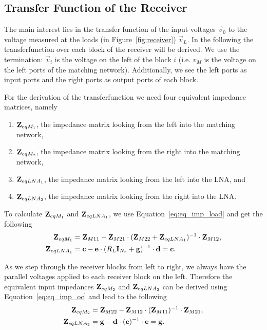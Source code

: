 \subsection{Transfer Function of the Receiver}
\label{sec:transf}
The main interest lies in the transfer function of the input voltages $\vec{v}_0$ to the voltage measured at the loads (in Figure~\ref{fig:receiver}) $\vec{v}_L$.
In the following the transferfunction over each block of the receiver will be derived.
We use the termination: $\vec{v}_i$ is the voltage on the left of the block $i$ (i.e. $v_{M}$ is the voltage on the left ports of the matching network).
Additionally, we see the left ports as input ports and the right ports as output ports of each block.

For the derivation of the transferfunction we need four equivalent impedance matrices, namely
\begin{enumerate}
\item{$\mathbf{Z}_{eqM_1}$, the impedance matrix looking from the left into the matching network,}
\item{$\mathbf{Z}_{eqM_2}$, the impedance matrix looking from the right into the matching network,}
\item{$\mathbf{Z}_{eqLNA_1}$, the impedance matrix looking from the left into the LNA, and}
\item{$\mathbf{Z}_{eqLNA_2}$, the impedance matrix looking from the right into the LNA.}
\end{enumerate}

To calculate $\mathbf{Z}_{eqM_1}$ and $\mathbf{Z}_{eqLNA_1}$, we use Equation~\eqref{eq:eq_imp_load} and get the following
\begin{align}
\label{eq:zeqm1}
\mathbf{Z}_{eqM_1} &= \mathbf{Z}_{M11} - \mathbf{Z}_{M21}\cdot(\mathbf{Z}_{M22} + \mathbf{Z}_{eqLNA_1})^{-1}\cdot\mathbf{Z}_{M12},\\
\label{eq:zeqlna1}
\mathbf{Z}_{eqLNA_1} &= \mathbf{c} - \mathbf{e}\cdot(R_L\mathbf{I}_{N_r} + \mathbf{g})^{-1}\cdot\mathbf{d} = \mathbf{c}.
\end{align}

As we step through the receiver blocks from left to right, we always have the parallel voltages applied to each receiver block on the left.
Therefore the equivalent input impedances $\mathbf{Z}_{eqM_2}$ and $\mathbf{Z}_{eqLNA_2}$ can be derived using Equation~\eqref{eq:eq_imp_oc} and lead to the following
\begin{align}
\label{eq:zeqm2}
\mathbf{Z}_{eqM_2} &= \mathbf{Z}_{M22} - \mathbf{Z}_{M12}\cdot(\mathbf{Z}_{M11})^{-1}\cdot\mathbf{Z}_{M21},\\
\label{eq:zeqlna2}
\mathbf{Z}_{eqLNA_2} &= \mathbf{g} - \mathbf{d}\cdot(\mathbf{c})^{-1}\cdot\mathbf{e} = \mathbf{g}.
\end{align}

